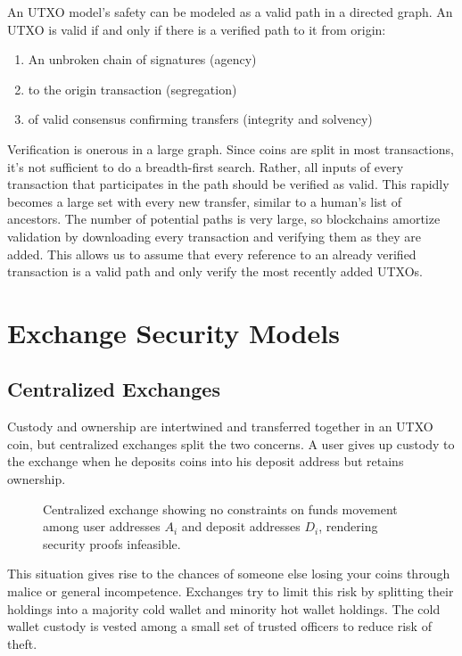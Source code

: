 \documentclass[12pt,a4paper]{article}
\begin{document}
An UTXO model’s safety can be modeled as a valid path in a directed graph. 
An UTXO is valid if and only if there is a verified path to it from origin: 
\begin{enumerate}
    \item An unbroken chain of signatures (agency)
    \item to the origin transaction (segregation) 
    \item of valid consensus confirming transfers (integrity and solvency)
\end{enumerate}
Verification is onerous in a large graph. Since coins are split in most transactions, it’s not sufficient to do a breadth-first search. Rather, all inputs of every transaction that participates in the path should be verified as valid. This rapidly becomes a large set with every new transfer, similar to a human’s list of ancestors. The number of potential paths is very large, so blockchains amortize validation by downloading every transaction and verifying them as they are added. This allows us to assume that every reference to an already verified transaction is a valid path and only verify the most recently added UTXOs.

\section{Exchange Security Models}
\subsection{Centralized Exchanges}
Custody and ownership are intertwined and transferred together in an UTXO coin, but centralized exchanges split the two concerns. A user gives up custody to the exchange when he deposits coins into his deposit address but retains ownership.
\begin{figure}[ht]
\begin{center}

\end{center}
\caption{Centralized exchange showing no constraints on funds movement among user addresses $A_i$ and deposit addresses $D_i$, rendering security proofs infeasible. }
\end{figure}

 This situation gives rise to the chances of someone else losing your coins through malice or general incompetence. Exchanges try to limit this risk by splitting their holdings into a majority cold wallet\cite{BTCColdStorage} and minority hot wallet holdings. The cold wallet custody is vested among a small set of trusted officers to reduce risk of theft.
\end{document}
